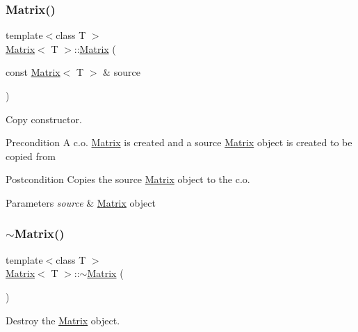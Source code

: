 \subsubsection{\texorpdfstring{Matrix()}{Matrix()}\hspace{0.1cm}{\footnotesize\ttfamily [3/4]}}
{\footnotesize\ttfamily template$<$class T $>$ \\
\mbox{\hyperlink{class_matrix}{Matrix}}$<$ T $>$\+::\mbox{\hyperlink{class_matrix}{Matrix}} (\begin{DoxyParamCaption}\item[{const \mbox{\hyperlink{class_matrix}{Matrix}}$<$ T $>$ \&}]{source }\end{DoxyParamCaption})}



Copy constructor. 

\begin{DoxyPrecond}{Precondition}
A c.\+o. \mbox{\hyperlink{class_matrix}{Matrix}} is created and a source \mbox{\hyperlink{class_matrix}{Matrix}} object is created to be copied from 
\end{DoxyPrecond}
\begin{DoxyPostcond}{Postcondition}
Copies the source \mbox{\hyperlink{class_matrix}{Matrix}} object to the c.\+o. 
\end{DoxyPostcond}

\begin{DoxyParams}{Parameters}
{\em source} & \mbox{\hyperlink{class_matrix}{Matrix}} object \\
\hline
\end{DoxyParams}
\mbox{\label{class_matrix_a91aa704de674203e96aece9e1955ccd3}} 
\subsubsection{\texorpdfstring{$\sim$Matrix()}{~Matrix()}}
{\footnotesize\ttfamily template$<$class T $>$ \\
\mbox{\hyperlink{class_matrix}{Matrix}}$<$ T $>$\+::$\sim$\mbox{\hyperlink{class_matrix}{Matrix}} (\begin{DoxyParamCaption}{ }\end{DoxyParamCaption})}



Destroy the \mbox{\hyperlink{class_matrix}{Matrix}} object. 

